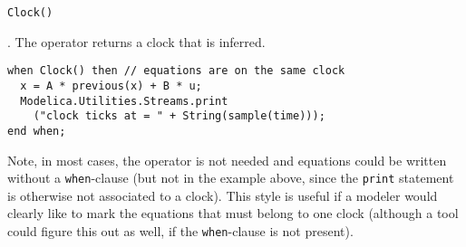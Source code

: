 \begin{operatordefinition*}[Clock]\label{modelica:clock-inferred}
\begin{synopsis}\begin{lstlisting}
Clock()
\end{lstlisting}\end{synopsis}
\begin{semantics}
.
The operator returns a clock that is inferred.

\begin{example}
\begin{lstlisting}[language=modelica]
when Clock() then // equations are on the same clock
  x = A * previous(x) + B * u;
  Modelica.Utilities.Streams.print
    ("clock ticks at = " + String(sample(time)));
end when;
\end{lstlisting}
Note, in most cases, the operator is not needed and equations could be written without a \lstinline!when!-clause (but not in the example above, since the \lstinline!print! statement is otherwise not associated to a clock).
This style is useful if a modeler would clearly like to mark the equations that must belong to one clock (although a tool could figure this out as well, if the \lstinline!when!-clause is not present).
\end{example}
\end{semantics}
\end{operatordefinition*}

